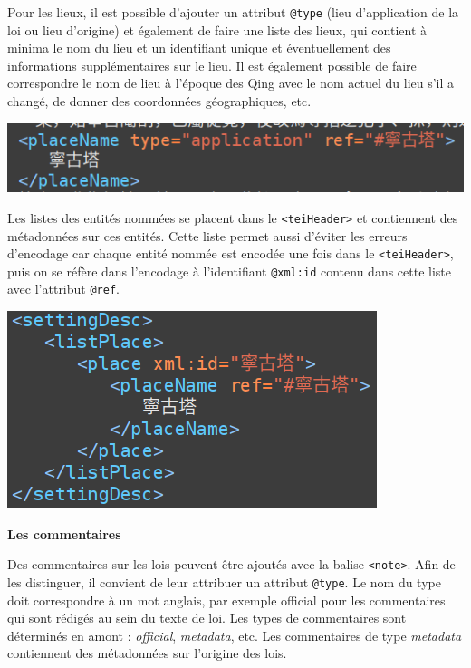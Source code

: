 Pour les lieux, il est possible d’ajouter un attribut \texttt{@type} (lieu d’application de la loi ou lieu d’origine) et également de faire une liste des lieux, qui contient à minima le nom du lieu et un identifiant unique et éventuellement des informations supplémentaires sur le lieu. Il est également possible de faire correspondre le nom de lieu à l’époque des Qing avec le nom actuel du lieu s’il a changé, de donner des coordonnées géographiques, etc.

\noindent \includegraphics[width=\textwidth]{images/annexe13.png}

Les listes des entités nommées se placent dans le \texttt{<teiHeader>} et contiennent des métadonnées sur ces entités. Cette liste permet aussi d’éviter les erreurs d’encodage car chaque entité nommée est encodée une fois dans le \texttt{<teiHeader>}, puis on se réfère dans l’encodage à l’identifiant \texttt{@xml:id} contenu dans cette liste avec l’attribut \texttt{@ref}. 

\noindent \includegraphics[width=\textwidth]{images/annexe14.png}

\bigskip
\textbf{Les commentaires}

Des commentaires sur les lois peuvent être ajoutés avec la balise \texttt{<note>}. Afin de les distinguer, il convient de leur attribuer un attribut \texttt{@type}. Le nom du type doit correspondre à un mot anglais, par exemple \og official \fg pour les commentaires qui sont rédigés au sein du texte de loi. Les types de commentaires sont déterminés en amont : \textit{official}, \textit{metadata}, etc. Les commentaires de type \textit{metadata} contiennent des métadonnées sur l’origine des lois. 


